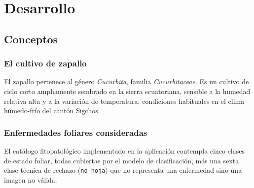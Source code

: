 \documentclass[12pt,a4paper]{article}
\begin{document}
\section{Desarrollo}

\subsection{Conceptos}

\subsubsection{El cultivo de zapallo}

El zapallo pertenece al género \textit{Cucurbita}, familia
\textit{Cucurbitaceae}. Es un cultivo de ciclo corto ampliamente sembrado en la
sierra ecuatoriana, sensible a la humedad relativa alta y a la variación de
temperatura, condiciones habituales en el clima húmedo-frío del cantón Sigchos.

\subsubsection{Enfermedades foliares consideradas}

El catálogo fitopatológico implementado en la aplicación contempla cinco clases
de estado foliar, todas cubiertas por el modelo de clasificación, más una sexta
clase técnica de rechazo (\texttt{no\_hoja}) que no representa una enfermedad
sino una imagen no válida.
\end{document}

